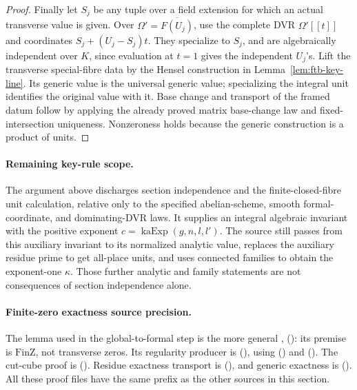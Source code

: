 \begin{proof}
Finally let \(S_j\) be any tuple over a field extension for which an
actual transverse value is given.
Over
\(\Omega'=\overline{F(U_j)}\), use the complete DVR
\(\Omega'[[t]]\) and coordinates
\(S_j+(U_j-S_j)t\).
They specialize to \(S_j\), and are algebraically independent over
\(K\), since evaluation at \(t=1\) gives the independent \(U_j\)'s.
Lift the transverse special-fibre data by the Hensel construction
in Lemma~\ref{lem:ftb-key-line}.
Its generic value is the universal generic value; specializing the
integral unit identifies the original value with it.
Base change and transport of the framed datum follow by applying
the already proved matrix base-change law and fixed-intersection
uniqueness.  Nonzeroness holds because the generic construction is
a product of units.
\end{proof}

\paragraph{Remaining key-rule scope.}
The argument above discharges section independence and the
finite-closed-fibre unit calculation, relative only to the specified
abelian-scheme, smooth formal-coordinate, and dominating-DVR laws.
It supplies an integral algebraic invariant with the positive
exponent \(c=\operatorname{kaExp}(g,n,l,l')\).
The source still passes from this auxiliary invariant to its
normalized analytic value, replaces the auxiliary residue prime to
get all-place units, and uses connected families to obtain the
exponent-one \(\kappa\).
Those further analytic and family statements are not consequences
of section independence alone.

\paragraph{Finite-zero exactness source precision.}
The lemma used in the global-to-formal step is the more general
,
():
its premise is \(\mathrm{FinZ}\), not transverse zeros.
Its regularity producer is
(),
using 
()
and 
().
The cut-cube proof is 
().
Residue exactness transport is 
(),
and generic exactness is 
().
All these proof files have the same 
prefix as the other sources in this section.
